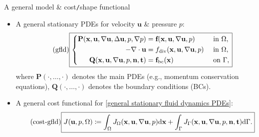 \documentclass[10pt
hyperref={
    pdfauthor={Hong Quan Ba Nguyen},
    pdftitle={Optimal Shape Design of Air Ducts in Combustion Engines: Design a General Framework},
    pdfsubject={Talk},
    pdfcreator={LaTeX},
}
]{beamer}
\begin{document}
\begin{frame}{A general model {\small\&} cost\texttt{/}shape functional}
    \begin{itemize}
        \item A general stationary PDEs for velocity $\textbf{u}$ {\small\&} pressure $p$:
        \begin{equation}
            \label{general stationary fluid dynamics PDEs}
            \tag{gfld}
            \boxed{\left\{\begin{split}
                \textbf{P}(\textbf{x},\textbf{u},\nabla\textbf{u},\Delta\textbf{u},p,\nabla p) &= \textbf{f}(\textbf{x},\textbf{u},\nabla\textbf{u},p) &&\mbox{ in } \Omega,\\
                -\nabla\cdot\textbf{u} &= f_{\rm div}(\textbf{x},\textbf{u},\nabla\textbf{u},p) &&\mbox{ in } \Omega,\\
                \textbf{Q}(\textbf{x},\textbf{u},\nabla\textbf{u},p,\textbf{n},\textbf{t}) &= \textbf{f}_{\rm bc}(\textbf{x}) &&\mbox{ on } \Gamma,
            \end{split}\right.}
        \end{equation}
        where $\textbf{P}(\cdot,\ldots,\cdot)$ denotes the main PDEs (e.g., momentum conservation equations), $\textbf{Q}(\cdot,\ldots,\cdot)$ denotes the boundary conditions (BCs).
        \item A general cost functional for \eqref{general stationary fluid dynamics PDEs}:
        \begin{align}
            \label{cost functional for general stationary fluid dynamics PDEs}
            \tag{cost-gfld}
            \boxed{J(\textbf{u},p,\Omega)\coloneqq\int_\Omega J_\Omega(\textbf{x},\textbf{u},\nabla\textbf{u},p){\rm d}\textbf{x} + \int_\Gamma J_\Gamma(\textbf{x},\textbf{u},\nabla\textbf{u},p,\textbf{n},\textbf{t}){\rm d}\Gamma.}
        \end{align}
    \end{itemize}
\end{frame}
\end{document}
